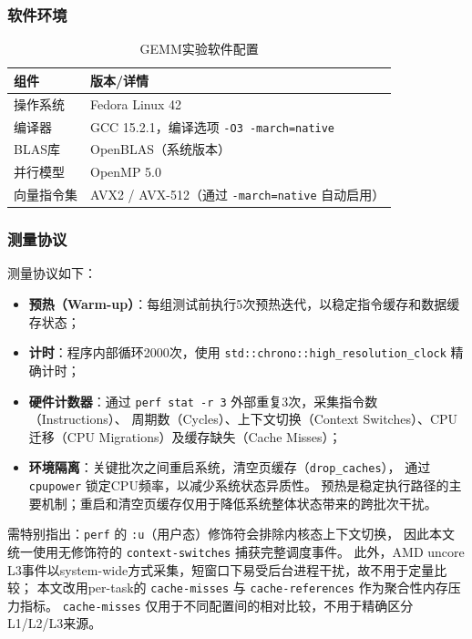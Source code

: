 \documentclass[a4paper,11pt,oneside]{article}
\begin{document}
\subsubsection{软件环境}

\begin{table}[H]
\centering
\begin{tabular}{p{}p{}}
\toprule
\textbf{组件} & \textbf{版本/详情} \\
\midrule
操作系统 & Fedora Linux 42 \\
编译器 & GCC 15.2.1，编译选项 \texttt{-O3 -march=native} \\
BLAS库 & OpenBLAS（系统版本）\\
并行模型 & OpenMP 5.0 \\
向量指令集 & AVX2 / AVX-512（通过 \texttt{-march=native} 自动启用）\\
\bottomrule
\end{tabular}
\caption{GEMM实验软件配置}
\label{tab:gemm_software}
\end{table}

\subsubsection{测量协议}\label{subsec:gemm_protocol}

测量协议如下：
\begin{itemize}
    \item \textbf{预热（Warm-up）}：每组测试前执行5次预热迭代，以稳定指令缓存和数据缓存状态；
    \item \textbf{计时}：程序内部循环2000次，使用 \texttt{std::chrono::high\_resolution\_clock} 精确计时；
    \item \textbf{硬件计数器}：通过 \texttt{perf stat -r 3} 外部重复3次，采集指令数（Instructions）、
          周期数（Cycles）、上下文切换（Context Switches）、CPU迁移（CPU Migrations）及缓存缺失（Cache Misses）；
    \item \textbf{环境隔离}：关键批次之间重启系统，清空页缓存（\texttt{drop\_caches}），
          通过 \texttt{cpupower} 锁定CPU频率，以减少系统状态异质性。
          预热是稳定执行路径的主要机制；重启和清空页缓存仅用于降低系统整体状态带来的跨批次干扰。
\end{itemize}

需特别指出：\texttt{perf} 的 \texttt{:u}（用户态）修饰符会排除内核态上下文切换，
因此本文统一使用无修饰符的 \texttt{context-switches} 捕获完整调度事件。
此外，AMD uncore L3事件以system-wide方式采集，短窗口下易受后台进程干扰，故不用于定量比较；
本文改用per-task的 \texttt{cache-misses} 与 \texttt{cache-references} 作为聚合性内存压力指标。
\texttt{cache-misses} 仅用于不同配置间的相对比较，不用于精确区分L1/L2/L3来源。
\end{document}
